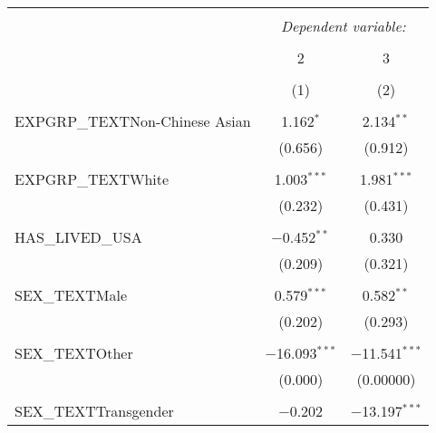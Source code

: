 \documentclass[]{article}
\title{}
\author{}
\begin{document}
	
	\maketitle
	
	\begin{abstract}
		
	\end{abstract}
	
	\section{}
	
\begin{table}[!htbp] \centering 
	\caption{} 
	\label{} 
	\begin{tabular}{@{\extracolsep{5pt}}lcc} 
		\\[-1.8ex]\hline 
		\hline \\[-1.8ex] 
		& \multicolumn{2}{c}{\textit{Dependent variable:}} \\ 
		\cline{2-3} 
		\\[-1.8ex] & 2 & 3 \\ 
		\\[-1.8ex] & (1) & (2)\\ 
		\hline \\[-1.8ex] 
		EXPGRP\_TEXTNon-Chinese Asian & 1.162$^{*}$ & 2.134$^{**}$ \\ 
		& (0.656) & (0.912) \\ 
		& & \\ 
		EXPGRP\_TEXTWhite & 1.003$^{***}$ & 1.981$^{***}$ \\ 
		& (0.232) & (0.431) \\ 
		& & \\ 
		HAS\_LIVED\_USA & $-$0.452$^{**}$ & 0.330 \\ 
		& (0.209) & (0.321) \\ 
		& & \\ 
		SEX\_TEXTMale & 0.579$^{***}$ & 0.582$^{**}$ \\ 
		& (0.202) & (0.293) \\ 
		& & \\ 
		SEX\_TEXTOther & $-$16.093$^{***}$ & $-$11.541$^{***}$ \\ 
		& (0.000) & (0.00000) \\ 
		& & \\ 
		SEX\_TEXTTransgender & $-$0.202 & $-$13.197$^{***}$ \\ 

\end{tabular}
\end{table}
\end{document}
